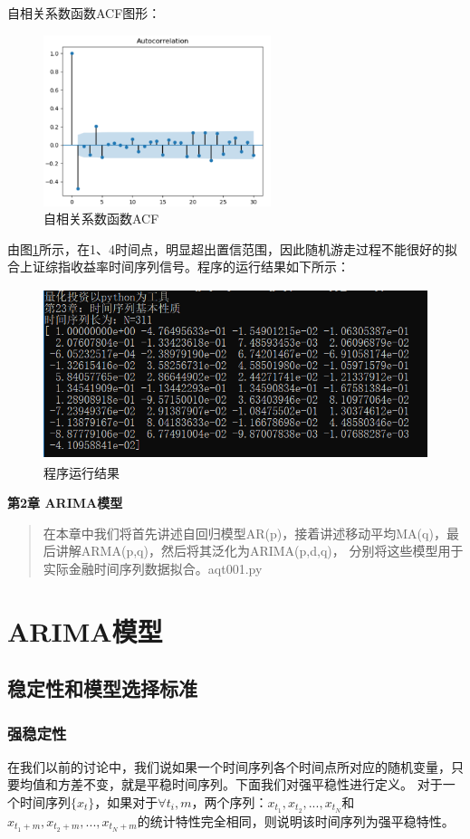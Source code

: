 \documentclass{article}
\begin{document}
自相关系数函数ACF图形：
\begin{figure}[H]
	\caption{自相关系数函数ACF}
	\label{f000011}
	\centering
	\includegraphics[height=5cm]{images/f000011}
\end{figure}
由图\ref{f000011}所示，在1、4时间点，明显超出置信范围，因此随机游走过程不能很好的拟合上证综指收益率时间序列信号。程序的运行结果如下所示：
\begin{figure}[H]
	\caption{程序运行结果}
	\label{f000012}
	\centering
	\includegraphics[height=5cm]{images/f000012}
\end{figure}

\maketitle\begin{center}
\Large \textbf{第2章 ARIMA模型}
\end{center}
\begin{abstract}
在本章中我们将首先讲述自回归模型AR(p)，接着讲述移动平均MA(q)，最后讲解ARMA(p,q)，然后将其泛化为ARIMA(p,d,q)，
分别将这些模型用于实际金融时间序列数据拟合。aqt001.py
\end{abstract}
\section{ARIMA模型}
\subsection{稳定性和模型选择标准}
\subsubsection{强稳定性}
在我们以前的讨论中，我们说如果一个时间序列各个时间点所对应的随机变量，只要均值和方差不变，就是平稳时间序列。下面我们对强平稳性进行定义。\newline
对于一个时间序列$\{ x_{t} \}$，如果对于$\forall t_{i},m$，两个序列：$x_{t_1}, x_{t_2},...,x_{t_N}$和$x_{t_1+m}, x_{t_2+m},...,x_{t_N+m}$的统计特性完全相同，则说明该时间序列为强平稳特性。
\end{document}
